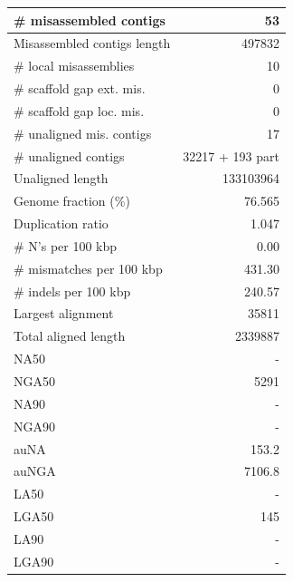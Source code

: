 \documentclass[12pt,a4paper]{article}
\begin{document}
\begin{table}[ht]
\begin{center}
\begin{tabular}{|l*{1}{|r}|}
\# misassembled contigs & 53 \\ \hline
Misassembled contigs length & 497832 \\ \hline
\# local misassemblies & 10 \\ \hline
\# scaffold gap ext. mis. & 0 \\ \hline
\# scaffold gap loc. mis. & 0 \\ \hline
\# unaligned mis. contigs & 17 \\ \hline
\# unaligned contigs & 32217 + 193 part \\ \hline
Unaligned length & 133103964 \\ \hline
Genome fraction (\%) & 76.565 \\ \hline
Duplication ratio & 1.047 \\ \hline
\# N's per 100 kbp & 0.00 \\ \hline
\# mismatches per 100 kbp & 431.30 \\ \hline
\# indels per 100 kbp & 240.57 \\ \hline
Largest alignment & 35811 \\ \hline
Total aligned length & 2339887 \\ \hline
NA50 & - \\ \hline
NGA50 & 5291 \\ \hline
NA90 & - \\ \hline
NGA90 & - \\ \hline
auNA & 153.2 \\ \hline
auNGA & 7106.8 \\ \hline
LA50 & - \\ \hline
LGA50 & 145 \\ \hline
LA90 & - \\ \hline
LGA90 & - \\ \hline
\end{tabular}
\end{center}
\end{table}
\end{document}
